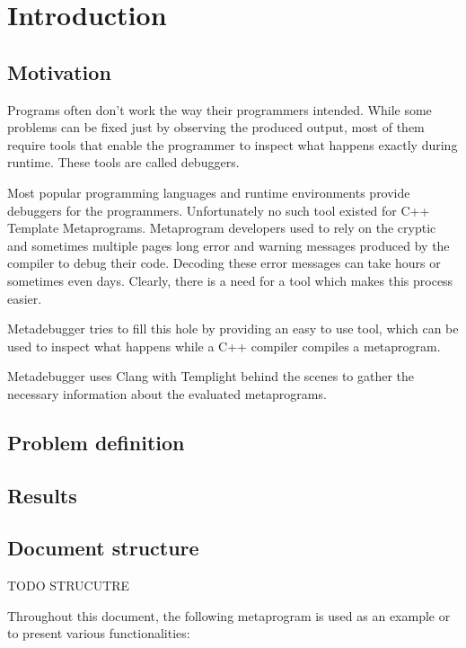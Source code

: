 
\chapter{Introduction}

\section{Motivation}

Programs often don't work the way their programmers intended. While some
problems can be fixed just by observing the produced output, most of them
require tools that enable the programmer to inspect what happens exactly
during runtime. These tools are called debuggers.

Most popular programming languages and runtime environments provide debuggers
for the programmers. Unfortunately no such tool existed for C++ Template
Metaprograms. Metaprogram developers used to rely on the cryptic and sometimes
multiple pages long error and warning messages produced by the compiler to
debug their code. Decoding these error messages can take hours or sometimes
even days. Clearly, there is a need for a tool which makes this process easier.

Metadebugger tries to fill this hole by providing an easy to use tool, which
can be used to inspect what happens while a C++ compiler compiles a
metaprogram.

Metadebugger uses Clang with Templight behind the scenes to gather the
necessary information about the evaluated metaprograms.

\section{Problem definition}

\section{Results} %

\section{Document structure} %

TODO STRUCUTRE

Throughout this document, the following metaprogram is used as an example or to
present various functionalities:


